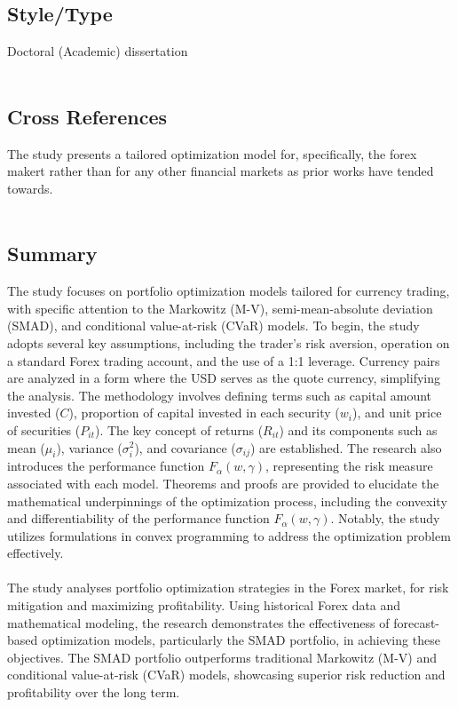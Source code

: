 \documentclass{article}
\begin{document}
    \subsection*{Style/Type}
    Doctoral (Academic) dissertation
    \\\\
    
    \subsection*{Cross References}
    The study presents a tailored optimization model for, specifically, the forex makert rather than for any other financial markets as prior works have tended towards.
    \\\\
    \subsection*{Summary}
     The study focuses on portfolio optimization models tailored for currency trading, with specific attention to the Markowitz (M-V), semi-mean-absolute deviation (SMAD), and conditional value-at-risk (CVaR) models. To begin, the study adopts several key assumptions, including the trader's risk aversion, operation on a standard Forex trading account, and the use of a 1:1 leverage. Currency pairs are analyzed in a form where the USD serves as the quote currency, simplifying the analysis. The methodology involves defining terms such as capital amount invested ($C$), proportion of capital invested in each security ($w_i$), and unit price of securities ($P_{it}$). The key concept of returns ($R_{it}$) and its components such as mean ($\mu_i$), variance ($\sigma_i^2$), and covariance ($\sigma_{ij}$) are established. The research also introduces the performance function $F_{\alpha}(w, \gamma)$, representing the risk measure associated with each model. Theorems and proofs are provided to elucidate the mathematical underpinnings of the optimization process, including the convexity and differentiability of the performance function $F_{\alpha}(w, \gamma)$. Notably, the study utilizes formulations in convex programming to address the optimization problem effectively.\\\\
    The study analyses portfolio optimization strategies in the Forex market, for risk mitigation and maximizing profitability. Using historical Forex data and mathematical modeling, the research demonstrates the effectiveness of forecast-based optimization models, particularly the SMAD portfolio, in achieving these objectives. The SMAD portfolio outperforms traditional Markowitz (M-V) and conditional value-at-risk (CVaR) models, showcasing superior risk reduction and profitability over the long term.\\\\
\end{document}
